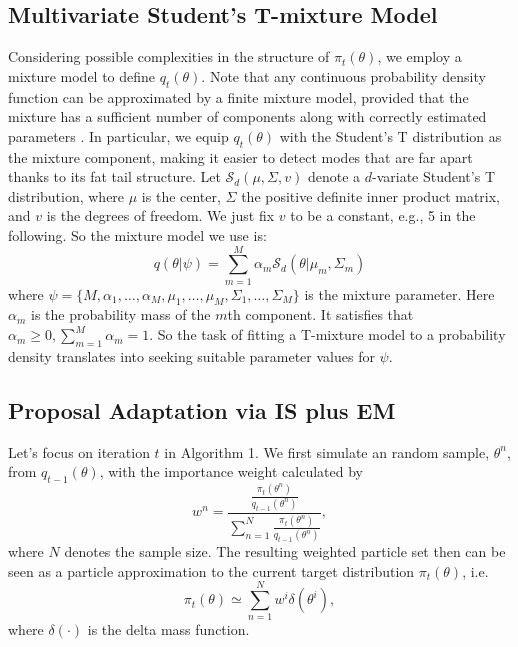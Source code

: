 \subsection{Multivariate Student's T-mixture Model}
Considering possible complexities in the structure of
$\pi_t(\theta)$, we employ a mixture model to define
$q_{t}(\theta)$. Note that any continuous probability density
function can be approximated by a finite mixture model, provided
that the mixture has a sufficient number of components along with
correctly estimated parameters
\citep{bishop2005neural,zeevi1997det}. In particular, we equip
$q_{t}(\theta)$ with the Student's T distribution as the mixture
component, making it easier to detect modes that are far apart
thanks to its fat tail structure. Let $\mathcal{S}_d(\mu,\Sigma,v)$
denote a $d$-variate Student's T distribution, where $\mu$ is the
center, $\Sigma$ the positive definite inner product matrix, and $v$
is the degrees of freedom. We just fix $v$ to be a constant, e.g., 5
in the following. So the mixture model we use is:
\begin{equation}\label{Definition_mixture}
q(\theta|\psi)=\sum\limits_{m=1}^M \alpha_{m}
\mathcal{S}_d(\theta|\mu_m,\Sigma_m)
\end{equation}
where
$\psi=\{M,\alpha_1,\ldots,\alpha_M,\mu_1,\ldots,\mu_M,\Sigma_1,\ldots,\Sigma_M\}$
is the mixture parameter. Here $\alpha_m$ is the probability mass of
the $m$th component. It satisfies that $\alpha_{m}\geq
0,\sum_{m=1}^M \alpha_{m}=1$. So the task of fitting a T-mixture
model to a probability density translates into seeking suitable
parameter values for $\psi$.

\subsection {Proposal Adaptation via IS plus EM}\label{sec:IS_EM}
Let's focus on iteration $t$ in Algorithm 1. We first simulate an
random sample, $\theta^n$, from $q_{t-1}(\theta)$, with the
importance weight calculated by
\begin{equation}
w^n=\frac{\frac{\pi_{t}(\theta^n)}{q_{t-1}(\theta^n)}}{\sum_{n=1}^N\frac{\pi_{t}(\theta^n)}{q_{t-1}(\theta^n)}},
\end{equation}
where $N$ denotes the sample size. The resulting weighted particle
set then can be seen as a particle approximation to the current
target distribution $\pi_t(\theta)$, i.e.
\begin{equation}\label{delta_mass_approx}
\pi_t(\theta)\simeq\sum\limits_{n=1}^Nw^i\delta(\theta^i),
\end{equation}
where $\delta(\cdot)$ is the delta mass function.

